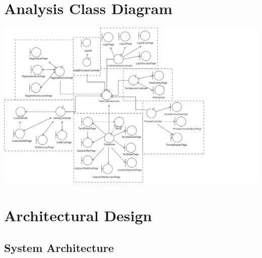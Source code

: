 \documentclass[]{article}
\begin{document}


\section{Analysis Class Diagram}
\label{sec:analysis_class_diagram}
\includegraphics[scale = 0.5]{Graphics/ACD.png}



\section{Architectural Design}
\label{sec:architectural_design}

\subsection{System Architecture}
\label{sub:system_architecture}
\end{document}
